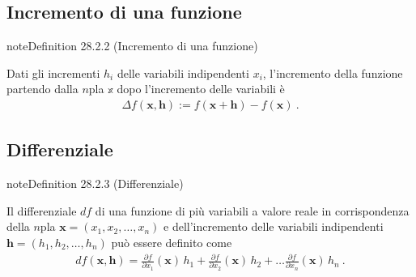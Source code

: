 \documentclass[letterpaper,10pt,italian]{jupyterBook}
\begin{document}
\subsection{Incremento di una funzione}
\label{\detokenize{ch/multivariable-calculus/derivatives:incremento-di-una-funzione}}\label{\detokenize{ch/multivariable-calculus/derivatives:multivariable-calculus-derivatives-increment}}\label{ch/multivariable-calculus/derivatives:definition-2}
\begin{sphinxadmonition}{note}{Definition 28.2.2 (Incremento di una funzione)}



\sphinxAtStartPar
Dati gli incrementi \(h_i\) delle variabili indipendenti \(x_i\), l’incremento della funzione partendo dalla \(n\)\sphinxhyphen{}pla \(\mathbb{x}\) dopo l’incremento delle variabili è
\begin{equation*}
\begin{split}\Delta f(\mathbf{x}, \mathbf{h}) := f(\mathbf{x} + \mathbf{h}) - f(\mathbf{x}) \ .\end{split}
\end{equation*}\end{sphinxadmonition}


\subsection{Differenziale}
\label{\detokenize{ch/multivariable-calculus/derivatives:differenziale}}\label{\detokenize{ch/multivariable-calculus/derivatives:multivariable-calculus-derivatives-differential}}\label{ch/multivariable-calculus/derivatives:definition-3}
\begin{sphinxadmonition}{note}{Definition 28.2.3 (Differenziale)}



\sphinxAtStartPar
Il differenziale \(d f\) di una funzione di più variabili a valore reale in corrispondenza della \(n\)\sphinxhyphen{}pla \(\mathbf{x} = (x_1, x_2, \dots, x_n)\) e dell’incremento delle variabili indipendenti \(\mathbf{h} = (h_1, h_2, \dots, h_n)\) può essere definito come
\begin{equation*}
\begin{split}d f (\mathbf{x}, \mathbf{h}) = \frac{\partial f}{\partial x_1}(\mathbf{x}) \,  h_1 +   
                                 \frac{\partial f}{\partial x_2}(\mathbf{x}) \,  h_2 + \dots
                                 \frac{\partial f}{\partial x_n}(\mathbf{x}) \,  h_n \ .  \end{split}
\end{equation*}\end{sphinxadmonition}
\end{document}
